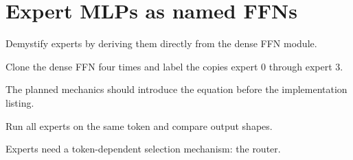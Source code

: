 \section{Expert MLPs as named FFNs}
\label{sec:ch03-expert-mlps-as-named-ffns}

Demystify experts by deriving them directly from the dense FFN module.



Clone the dense FFN four times and label the copies expert 0 through expert 3.



The planned mechanics should introduce the equation before the implementation listing.





\begin{checkpointbox}
Run all experts on the same token and compare output shapes.
\end{checkpointbox}

Experts need a token-dependent selection mechanism: the router.
